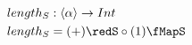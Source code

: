 \documentclass[preview]{standalone}
\begin{document}
\begin{align*}
  length_S &: \vect{\alpha} \rightarrow Int \\
  length_S &= (+) \redS \circ (1) \fMapS
\end{align*}
\end{document}
